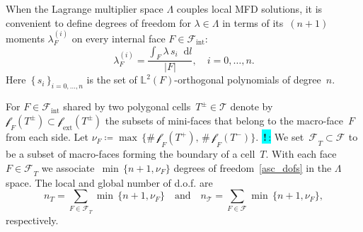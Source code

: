 \documentclass[12pt]{article}
\newcommand{\svginputw}[2][\linewidth]{\def\svgwidth{#1}} %
\newcommand{\vect}[1]{\boldsymbol{\mathbf{#1}}}
\newcommand{\bcell}{T}
\newcommand{\bmesh}{{\vect{\mathcal T}}}
\newcommand{\mmesh}{{\vect{\mathcal \tau}}}
\newcommand{\bface}{F}
\newcommand{\bfaces}[1][]{{\vect{\mathcal F}_{\text{#1}}}}
\newcommand{\mfaces}[1][]{{\vect{\mathcal f}_{\text{#1}}}}
\newcommand{\LTwoSpace}[1][\Omega]{{\mathbb L^2\left({#1}\right)}}
\newcommand{\toDiscuss}[1]{\colorbox{Cyan}{\textbf{\,!\,}:} #1}
\newcommand*\diff{\mathop{}\!\mathrm{d}}
\begin{document}
%	
	
When the Lagrange multiplier space $\Lambda$ couples local MFD solutions, it is convenient to define
degrees of freedom for $\lambda\in\Lambda$ in terms of its~$(n+1)$ moments $\lambda^{(i)}_F$ on every internal face $F\in\bfaces[int]$:
\begin{equation}\label{asc_dofs}
	\lambda^{(i)}_F=\frac{\int_F  \lambda\,s_i \diff l}{|F|}, \quad i = 0, \dots, n.
\end{equation}
Here~$\{\,s_i\,\}_{i=0,\dots,n}$ is the set of $\LTwoSpace[\bface]$-orthogonal polynomials of degree~$n$.
	
For $F \in \bfaces[int]$ shared by two polygonal cells~$\bcell^\pm\in \bmesh$  denote by~$\mfaces_F(T^\pm) \subset \mfaces_{\text{ext}}(T^\pm)$ the subsets of mini-faces that belong to the macro-face~$F$ from each side. Let $\nu_F \coloneqq \max\,\{ \#\,\mfaces_F(T^+),\,\#\,\mfaces_F(T^-) \}$. \toDiscuss{We} set~$\bfaces_\bcell \subset \bfaces$ to be a subset of macro-faces forming the boundary of a cell~$T$. With each face $F \in \bfaces_\bcell$ we associate~$\min\,\{ n+1, \nu_F \}$ degrees of freedom~\eqref{asc_dofs} in the $\Lambda$ space. The local and global number of d.o.f. are
\[
	n_\bcell = \sum_{F \in \bfaces_\bcell} \min\,\{ n+1, \nu_F \} \quad\text{and}\quad
	n_\bmesh = \sum_{F \in \bfaces} \min\,\{ n+1, \nu_F \},
\]
respectively.
	
\end{document}
